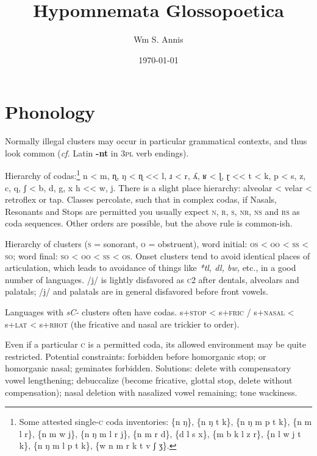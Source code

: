 \documentclass[11pt]{article}
\newcommand{\LL}[1]{\textbf{#1}}  %
\newcommand{\I}[1]{\textsc{#1}}   %
\begin{document}
\frenchspacing
\title{Hypomnemata Glossopoetica}
\author{Wm S. Annis}
\date{\today}
\maketitle

\section{Phonology}

Normally illegal clusters may occur in particular grammatical
contexts, and thus look common (\textit{cf.} Latin \LL{-nt} in \I{3pl}
verb endings).

Hierarchy of codas:\footnote{Some attested single-\I{c} coda
  inventories: \{n ŋ\}, \{n ŋ t k\}, \{n ŋ m p t k\}, \{n m l r\}, \{n
  m w j\}, \{n ŋ m l r j\}, \{n m r d\}, \{d l s x\}, \{m b k l z r\},
  \{n l w j t k\}, \{n ŋ m l p t k\}, \{w n m r k t v ʃ ʒ\}.} n < m,
ɳ, ŋ < ɳ << l, ɹ < r, ʎ, ʁ < ɭ, ɽ << t < k, p < s, z, c, q, ʃ < b, d,
g, x h << w, j.  There is a slight place hierarchy: alveolar < velar <
retroflex or tap.  Classes percolate, such that in complex codas, if
Nasals, Resonants and Stops are permitted you usually expect \I{n, r,
  s, nr, ns} and \I{rs} as coda sequences.  Other orders are possible,
but the above rule is common-ish.

Hierarchy of clusters (\I{s} = sonorant, \I{o} = obstruent), word
initial: \I{os} < \I{oo} < \I{ss} < \I{so}; word final: \I{so} <
\I{oo} < \I{ss} < \I{os}.  Onset clusters tend to avoid identical
places of articulation, which leads to avoidance of things like
\textit{*tl, dl, bw,} etc., in a good number of languages. /j/ is
lightly disfavored as \I{c2} after dentals, alveolars and palatals;
/j/ and palatals are in general disfavored before front vowels.

Languages with \textit{sC-} clusters often have codas.  s+\I{stop} <
s+\I{fric} / s+\I{nasal} < s+\I{lat} < s+\I{rhot} (the fricative and
nasal are trickier to order).

Even if a particular \I{c} is a permitted coda, its allowed
environment may be quite restricted. Potential constraints: forbidden
before homorganic stop; or homorganic nasal; geminates
forbidden. Solutions: delete with compensatory vowel lengthening;
debuccalize (become fricative, glottal stop, delete without
compensation); nasal deletion with nasalized vowel remaining;
tone wackiness.
\end{document}
